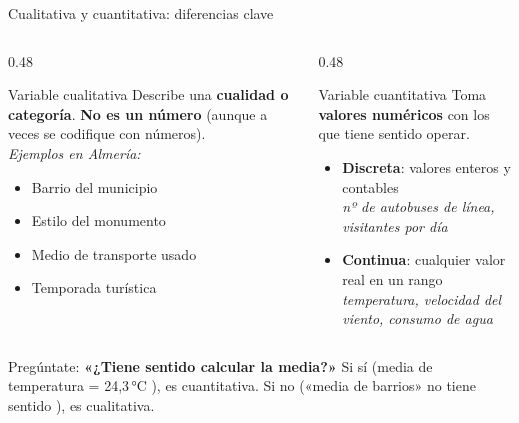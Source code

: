 \documentclass[aspectratio=169, 10pt, spanish]{beamer}
\begin{document}
\begin{frame}{Cualitativa y cuantitativa: diferencias clave}
  \begin{columns}[T]
    \begin{column}{0.48\textwidth}
      \begin{definicionbox}{Variable cualitativa}
        \AlmFontSmall
        Describe una \textbf{cualidad o categoría}.
        \textbf{No es un número} (aunque a veces se codifique con números).\\[4pt]
        \textit{Ejemplos en Almería:}
        \begin{itemize}\setlength\itemsep{2pt}
          \item Barrio del municipio
          \item Estilo del monumento
          \item Medio de transporte usado
          \item Temporada turística
        \end{itemize}
      \end{definicionbox}
    \end{column}
    \begin{column}{0.48\textwidth}
      \begin{definicionbox}{Variable cuantitativa}
        \AlmFontSmall
        Toma \textbf{valores numéricos} con los que tiene sentido operar.\\[4pt]
        \begin{itemize}\setlength\itemsep{2pt}
          \item \textbf{Discreta}: valores enteros y contables\\
            \textit{nº de autobuses de línea, visitantes por día}
          \item \textbf{Continua}: cualquier valor real en un rango\\
            \textit{temperatura, velocidad del viento, consumo de agua}
        \end{itemize}
      \end{definicionbox}
    \end{column}
  \end{columns}

  \vspace{0.15cm}
  \begin{notabox}
    \AlmFontSmall
    Pregúntate: \textbf{«¿Tiene sentido calcular la media?»}
    Si sí (media de temperatura = 24{,}3\,°C \correcto),
    es cuantitativa.
    Si no («media de barrios» no tiene sentido \incorrecto),
    es cualitativa.
  \end{notabox}
\end{frame}
\end{document}
